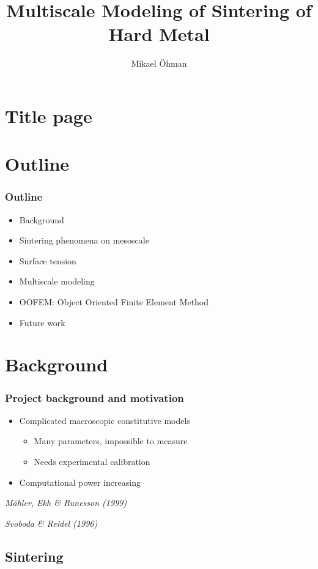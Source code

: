 \documentclass[11pt,mathserif]{beamer}
\title{Multiscale Modeling of Sintering of Hard Metal}
\author{Mikael Öhman}
\institute{Chalmers University of Technology}
\newcommand{\roughcite}[1]{\textit{#1}}
\begin{document}
\section{Title page}
\begin{frame}[plain]
 \titlepage
\end{frame}

\section{Outline}
\begin{frame}
 \frametitle{Outline}

\begin{itemize}
 \item Background
 \item Sintering phenomena on mesoscale
 \item Surface tension
 \item Multiscale modeling
 \item OOFEM: Object Oriented Finite Element Method
 \item Future work
\end{itemize}
\end{frame}

\section{Background}
\begin{frame}
 \frametitle{Project background and motivation}
 \begin{itemize}
  \item Complicated macroscopic constitutive models
  \begin{itemize}
    \item Many parameters, impossible to measure
    \item Needs experimental calibration
  \end{itemize}
  \item Computational power increasing
 \end{itemize}

 \roughcite{Mähler, Ekh \& Runesson (1999)}

 \roughcite{Svoboda \& Reidel  (1996)}
\end{frame}

\subsection{Sintering}
\end{document}
